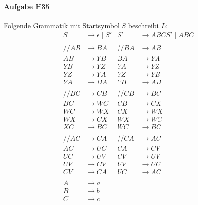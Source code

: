 \documentclass[11pt]{article}
\begin{document}
\paragraph{Aufgabe H35} Folgende Grammatik mit Startsymbol $S$ beschreibt $L$:
\begin{align*}
S &\rightarrow \epsilon \mid S'	& S' &\rightarrow ABCS' \mid ABC	    \\\\
//AB &\rightarrow BA 	& //BA &\rightarrow AB	\\
AB &\rightarrow YB 		& BA &\rightarrow YA	\\
YB &\rightarrow YZ		& YA &\rightarrow YZ	\\
YZ &\rightarrow YA		& YZ &\rightarrow YB	\\
YA &\rightarrow  BA		& YB &\rightarrow AB	\\\\
//BC &\rightarrow CB 	& //CB &\rightarrow BC	\\
BC &\rightarrow WC		& CB &\rightarrow CX	\\
WC &\rightarrow WX		& CX &\rightarrow WX	\\
WX &\rightarrow CX		& WX &\rightarrow WC	\\
XC &\rightarrow BC		& WC &\rightarrow BC	\\\\
//AC &\rightarrow CA 	& //CA &\rightarrow AC	\\
AC &\rightarrow UC		& CA &\rightarrow CV	\\
UC &\rightarrow UV		& CV &\rightarrow UV	\\
UV &\rightarrow CV		& UV &\rightarrow UC	\\
CV &\rightarrow CA		& UC &\rightarrow AC	\\\\
A &\rightarrow a								\\
B &\rightarrow b								\\
C &\rightarrow c								\\
\end{align*}
\end{document}
